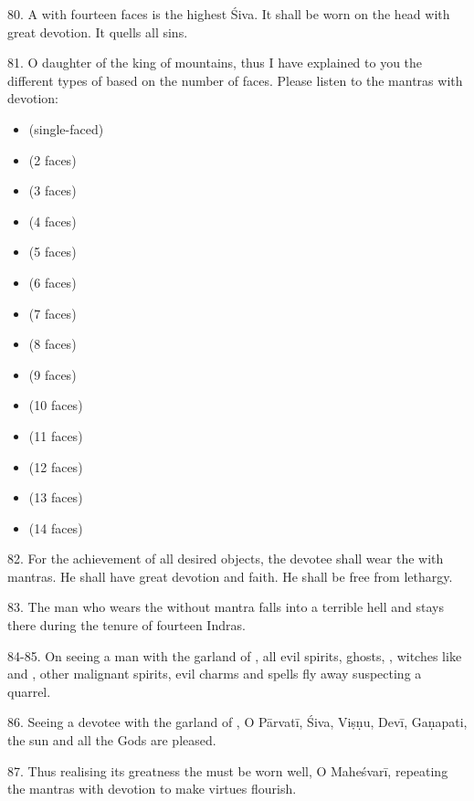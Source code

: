 80. A  with fourteen faces is the highest Śiva. It shall be worn on
the head with great devotion. It quells all sins.

81. O daughter of the king of mountains, thus I have explained to you
the different types of  based on the number of faces. Please listen
to the mantras with devotion:

\begin{itemize}
  \item{} (single-faced)
  \item{} (2 faces)
  \item{} (3 faces)
  \item{} (4 faces)
  \item{} (5 faces)
  \item{} (6 faces)
  \item{} (7 faces)
  \item{} (8 faces)
  \item{} (9 faces)
  \item{} (10 faces)
  \item{} (11 faces)
  \item{} (12 faces)
  \item{} (13 faces)
  \item{} (14 faces)
\end{itemize}

82. For the achievement of all desired objects, the devotee shall wear
the  with mantras. He shall have great devotion and faith. He shall
be free from lethargy.

83. The man who wears the  without mantra falls into a terrible
hell and stays there during the tenure of fourteen Indras.

84-85. On seeing a man with the garland of , all evil spirits,
ghosts, , witches like  and , other malignant
spirits, evil charms and spells \etc fly away suspecting a quarrel.

86. Seeing a devotee with the garland of , O Pārvatī, Śiva, Viṣṇu,
Devī, Gaṇapati, the sun and all the Gods are pleased.

87. Thus realising its greatness the  must be worn well,
O Maheśvarī, repeating the mantras with devotion to make virtues flourish.

